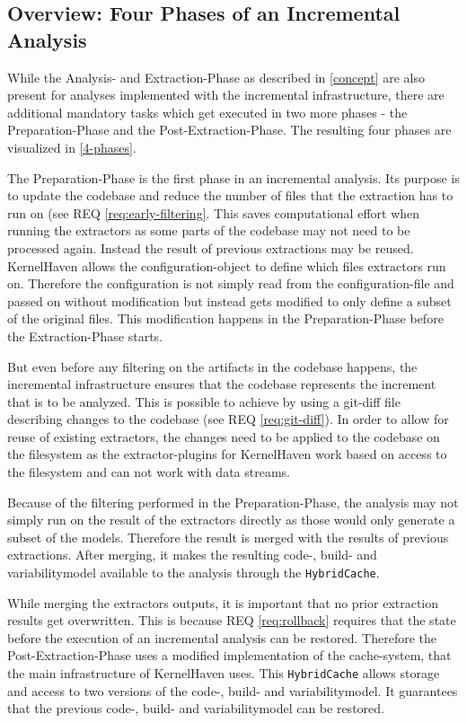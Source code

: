\documentclass[a4paper]{article}
\begin{document}
\subsection{Overview: Four Phases of an Incremental Analysis}


While the Analysis- and Extraction-Phase as described in \autoref{concept} are also present for analyses implemented with the incremental infrastructure, there are additional mandatory tasks which get executed in two more phases - the Preparation-Phase and the Post-Extraction-Phase. The resulting four phases are visualized in \autoref{4-phases}.

The Preparation-Phase is the first phase in an incremental analysis. Its purpose is to update the codebase and reduce the number of files that the extraction has to run on (see REQ \ref{req:early-filtering}. This saves computational effort when running the extractors as some parts of the codebase  may not need to be processed again. Instead the result of previous extractions may be reused. KernelHaven allows the configuration-object to define which files extractors run on. Therefore the configuration is not simply read from the configuration-file and passed on without modification but instead gets modified to only define a subset of the original files. This modification happens in the Preparation-Phase before the Extraction-Phase starts.

 But even before any filtering on the artifacts in the codebase happens, the incremental infrastructure ensures that the codebase represents the increment that is to be analyzed. This is possible to achieve by using a git-diff file describing changes to the codebase (see REQ \ref{req:git-diff}). In order to allow for reuse of existing extractors, the changes need to be applied to the codebase on the filesystem as the extractor-plugins for KernelHaven work based on access to the filesystem and can not work with data streams.

Because of the filtering performed in the Preparation-Phase, the analysis may not simply run on the result of the extractors directly as those would only generate a subset of the models. Therefore the result is merged with the results of previous extractions. After merging, it makes the resulting code-, build- and variabilitymodel available to the analysis through the \texttt{HybridCache}.

While merging the extractors outputs, it is important that no prior extraction results get overwritten. This is because REQ \ref{req:rollback} requires that the state before the execution of an incremental analysis can be restored. Therefore the Post-Extraction-Phase uses a modified implementation of the cache-system, that the main infrastructure of KernelHaven uses. This \texttt{HybridCache} allows storage and access to two versions of the code-, build- and variabilitymodel. It guarantees that the previous code-, build- and variabilitymodel can be restored.
\end{document}
